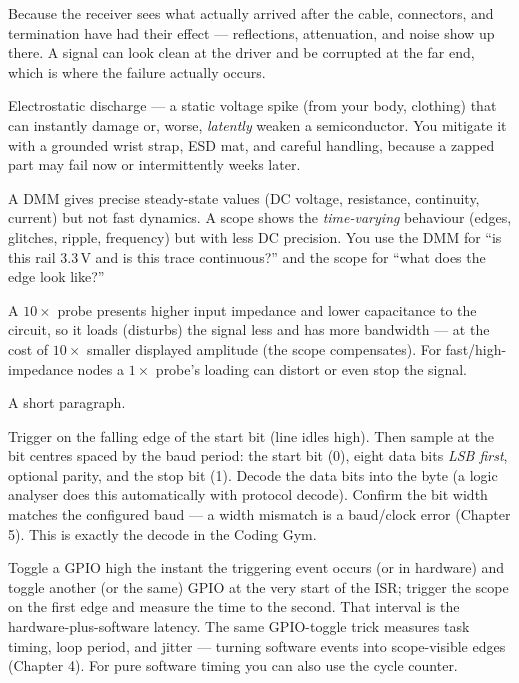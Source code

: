 Because the receiver sees what actually arrived after the cable, connectors, and
termination have had their effect --- reflections, attenuation, and noise show up
there. A signal can look clean at the driver and be corrupted at the far end,
which is where the failure actually occurs.

Electrostatic discharge --- a static voltage spike (from your body, clothing)
that can instantly damage or, worse, \emph{latently} weaken a semiconductor. You
mitigate it with a grounded wrist strap, ESD mat, and careful handling, because a
zapped part may fail now or intermittently weeks later.

A DMM gives precise steady-state values (DC voltage, resistance, continuity,
current) but not fast dynamics. A scope shows the \emph{time-varying} behaviour
(edges, glitches, ripple, frequency) but with less DC precision. You use the DMM
for ``is this rail 3.3\,V and is this trace continuous?'' and the scope for ``what
does the edge look like?''

A $10\times$ probe presents higher input impedance and lower capacitance to the
circuit, so it loads (disturbs) the signal less and has more bandwidth --- at the
cost of $10\times$ smaller displayed amplitude (the scope compensates). For
fast/high-impedance nodes a $1\times$ probe's loading can distort or even stop the
signal.

%
{A short paragraph.}

Trigger on the falling edge of the start bit (line idles high). Then sample at
the bit centres spaced by the baud period: the start bit (0), eight data bits
\emph{LSB first}, optional parity, and the stop bit (1). Decode the data bits
into the byte (a logic analyser does this automatically with protocol decode).
Confirm the bit width matches the configured baud --- a width mismatch is a
baud/clock error (Chapter 5). This is exactly the decode in the Coding Gym.

Toggle a GPIO high the instant the triggering event occurs (or in hardware) and
toggle another (or the same) GPIO at the very start of the ISR; trigger the scope
on the first edge and measure the time to the second. That interval is the
hardware-plus-software latency. The same GPIO-toggle trick measures task timing,
loop period, and jitter --- turning software events into scope-visible edges
(Chapter 4). For pure software timing you can also use the  cycle
counter.

